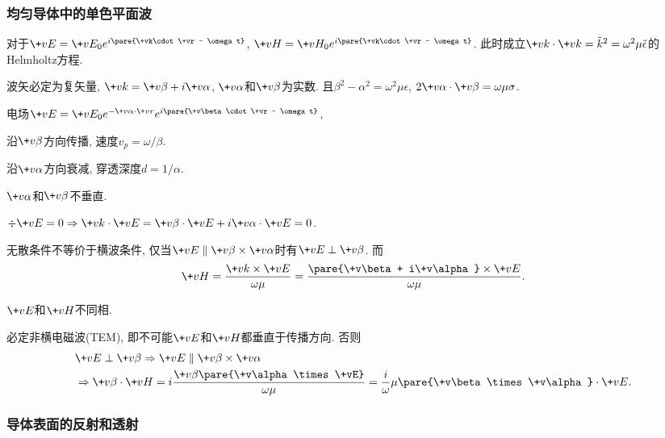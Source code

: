 \documentclass[hidelinks]{ctexart}
\begin{document}

\subsubsection{均匀导体中的单色平面波} %
\label{ssub:均匀导体中的单色平面波}

对于$\+vE = \+vE_0 e^{i\pare{\+vk\cdot \+vr - \omega t}}$, $\+vH = \+vH_0 e^{i\pare{\+vk\cdot \+vr - \omega t}}$. 此时成立$\+vk\cdot \+vk = \tilde{k}^2 = \omega^2 \mu \tilde{\epsilon}$的Helmholtz方程.
\begin{cenum}
    \item 波矢必定为复矢量, $\+vk = \+v\beta + i\+v\alpha$, $\+v\alpha$和$\+v\beta$为实数. 且$\beta^2 - \alpha^2 = \omega^2 \mu\epsilon$, $2\+v\alpha\cdot \+v\beta = \omega\mu\sigma$.
    \item 电场$\+vE = \+vE_0 e^{-\+v\alpha\cdot \+vr}e^{i\pare{\+v\beta\cdot \+vr - \omega t}}$,
    \begin{cenum}
        \item 沿$\+v\beta$方向传播, 速度$v_p = \omega/\beta$.
        \item 沿$\+v\alpha$方向衰减, 穿透深度$d = 1/\alpha$.
        \item $\+v\alpha$和$\+v\beta$不垂直.
    \end{cenum}
    $\div \+vE = 0 \Rightarrow \+vk\cdot \+vE = \+v\beta\cdot \+vE + i\+v\alpha\cdot \+vE = 0$.
    \item 无散条件不等价于横波条件, 仅当$\+vE \parallel \+v\beta\times \+v\alpha$时有$\+vE\perp \+v\beta$. 而
    \[ \+vH = \frac{\+vk\times \+vE}{\omega\mu} = \frac{\pare{\+v\beta + i\+v\alpha}\times \+vE}{\omega \mu}. \]
    \item $\+vE$和$\+vH$不同相.
    \item 必定非横电磁波(TEM), 即不可能$\+vE$和$\+vH$都垂直于传播方向. 否则
    \begin{align*}
        & \+vE\perp \+v\beta \Rightarrow \+vE \parallel \+v\beta\times \+v\alpha \\
        & \Rightarrow \+v\beta\cdot \+vH = i\frac{\+v\beta\pare{\+v\alpha\times \+vE}}{\omega\mu} = \frac{i}{\omega}{\mu}\pare{\+v\beta\times\+v\alpha}\cdot \+vE.
    \end{align*}
\end{cenum}


\subsubsection{导体表面的反射和透射} %
\label{ssub:导体表面的反射和透射}
\end{document}
